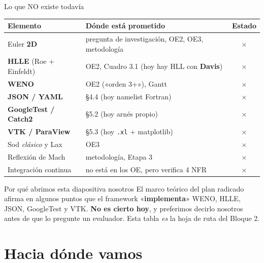 \documentclass[aspectratio=169,10pt]{beamer}
\newcommand{\no}{\textcolor{rojo}{$\times$}}
\newcommand{\cod}[1]{\texttt{\small #1}}
\begin{document}
\begin{frame}[shrink]{Lo que NO existe todavía}

  \centering\scriptsize
  \begin{tabular}{@{}llc@{}}
    \toprule
    \textbf{Elemento} & \textbf{Dónde está prometido} & \textbf{Estado} \\
    \midrule
    Euler \textbf{2D}                & pregunta de investigación, OE2, OE3, metodología & \no \\
    \textbf{HLLE} (Roe + Einfeldt)   & OE2, Cuadro 3.1 \; (hoy hay HLL con \textbf{Davis}) & \no \\
    \textbf{WENO}                    & OE2 («orden 3+»), Gantt & \no \\
    \textbf{JSON / YAML}             & §4.4 \; (hoy namelist Fortran) & \no \\
    \textbf{GoogleTest / Catch2}     & §5.2 \; (hoy arnés propio) & \no \\
    \textbf{VTK / ParaView}          & §5.3 \; (hoy \cod{.xl} + matplotlib) & \no \\
    Sod \emph{clásico} y Lax         & OE3 & \no \\
    Reflexión de Mach                & metodología, Etapa 3 & \no \\
    Integración continua             & no está en los OE, pero verifica 4 NFR & \no \\
    \bottomrule
  \end{tabular}

  \vspace{0.7em}
  \begin{alertblock}{Por qué abrimos esta diapositiva nosotros}
    \small
    El marco teórico del plan radicado afirma en algunos puntos que el framework
    «\textbf{implementa}» WENO, HLLE, JSON, GoogleTest y VTK. \textbf{No es cierto
    hoy}, y preferimos decirlo nosotros antes de que lo pregunte un evaluador.
    Esta tabla \emph{es} la hoja de ruta del Bloque 2.
  \end{alertblock}
\end{frame}

\section{Hacia dónde vamos}
\end{document}
